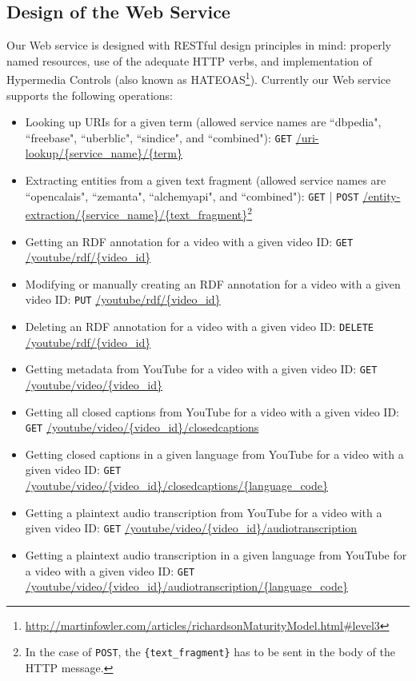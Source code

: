 \documentclass{acm_proc_article-sp}
\begin{document}
\subsection{Design of the Web Service}\label{sec:design}
Our Web service is designed with RESTful design principles in mind: properly named resources, use of the adequate HTTP verbs, and implementation of Hypermedia Controls (also known as HATEOAS\footnote{\url{http://martinfowler.com/articles/richardsonMaturityModel.html#level3}}). Currently our Web service supports the following operations:
\begin{itemize}
\item Looking up URIs for a given term (allowed service names are ``dbpedia", ``freebase", ``uberblic", ``sindice", and ``combined"): \texttt{GET} \url{/uri-lookup/{service_name}/{term}} 
\item Extracting entities from a given text fragment (allowed service names are ``opencalais", ``zemanta", ``alchemyapi", and ``combined"): \texttt{GET} | \texttt{POST} \url{/entity-extraction/{service_name}/{text_fragment}}\footnote{In the case of \texttt{POST}, the \texttt{\{text\_fragment\}} has to be sent in the body of the HTTP message.}
\item Getting an RDF annotation for a video with a given video ID: \texttt{GET} \url{/youtube/rdf/{video_id}}
\item Modifying or manually creating an RDF annotation for a video with a given video ID: \texttt{PUT} \url{/youtube/rdf/{video_id}}
\item Deleting an RDF annotation for a video with a given video ID: \texttt{DELETE} \url{/youtube/rdf/{video_id}}
\item Getting metadata from YouTube for a video with a given video ID: \texttt{GET} \url{/youtube/video/{video_id}}
\item Getting all closed captions from YouTube for a video with a given video ID: \texttt{GET} \url{/youtube/video/{video_id}/closedcaptions}
\item Getting closed captions in a given language from YouTube for a video with a given video ID: \texttt{GET} \url{/youtube/video/{video_id}/closedcaptions/{language_code}}
\item Getting a plaintext audio transcription from YouTube for a video with a given video ID: \texttt{GET} \url{/youtube/video/{video_id}/audiotranscription}
\item Getting a plaintext audio transcription in a given language from YouTube for a video with a given video ID: \texttt{GET} \url{/youtube/video/{video_id}/audiotranscription/{language_code}}
\end{itemize}
\end{document}
